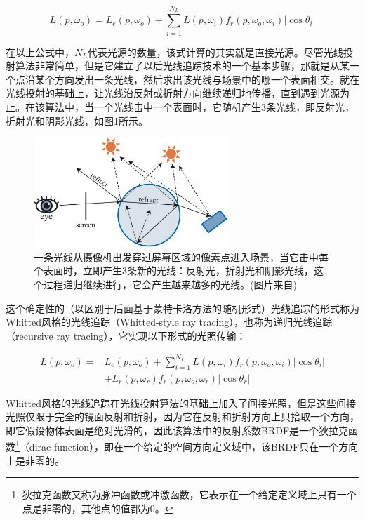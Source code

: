 \begin{equation}
	L(p,\omega_o)=L_e(p, \omega_o)+\sum_{i=1}^{N_L}L(p,\omega_i) f_r(p,\omega_o,\omega_i)|\cos\theta_i|
\end{equation}

在以上公式中，$N_L$代表光源的数量，该式计算的其实就是直接光源。尽管光线投射算法非常简单，但是它建立了以后光线追踪技术的一个基本步骤，那就是从某一个点沿某个方向发出一条光线，然后求出该光线与场景中的哪一个表面相交。\cite{a:ray-tracing}就在光线投射的基础上，让光线沿反射或折射方向继续递归地传播，直到遇到光源为止。在该算法中，当一个光线击中一个表面时，它随机产生3条光线，即反射光，折射光和阴影光线，如图\ref{f:pt-recursive-ray-tracing}所示。

\begin{figure}
\sidecaption
	\includegraphics[width=0.65\textwidth]{figures/pt/path-2}
	\caption{一条光线从摄像机出发穿过屏幕区域的像素点进入场景，当它击中每个表面时，立即产生3条新的光线：反射光，折射光和阴影光线，这个过程递归继续进行，它会产生越来越多的光线。(图片来自\cite{b:rtr})}
	\label{f:pt-recursive-ray-tracing}
\end{figure}

这个确定性的（以区别于后面基于蒙特卡洛方法的随机形式）光线追踪的形式称为Whitted风格的光线追踪（Whitted-style ray tracing），也称为递归光线追踪（recursive ray tracing），它实现以下形式的光照传输：

\begin{equation}
\begin{aligned}
	L(p,\omega_o)=&L_e(p, \omega_o)+\sum_{i=1}^{N_L}L(p,\omega_i) f_r(p,\omega_o,\omega_i)|\cos\theta_i|\\
	&+L_r(p,\omega_r)f_r(p,\omega_o,\omega_r)|\cos\theta_r|
\end{aligned}
\end{equation}

Whitted风格的光线追踪在光线投射算法的基础上加入了间接光照，但是这些间接光照仅限于完全的镜面反射和折射，因为它在反射和折射方向上只拾取一个方向，即它假设物体表面是绝对光滑的，因此该算法中的反射系数BRDF是一个狄拉克函数\footnote{狄拉克函数又称为脉冲函数或冲激函数，它表示在一个给定定义域上只有一个点是非零的，其他点的值都为0。}（dirac function），即在一个给定的空间方向定义域中，该BRDF只在一个方向上是非零的。

